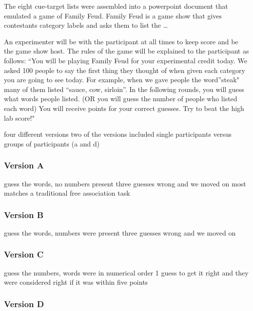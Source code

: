 \documentclass[man]{apa6}
\theoremstyle{definition}
\theoremstyle{definition}
\theoremstyle{definition}
\theoremstyle{remark}
\begin{document}
The eight cue-target lists were assembled into a powerpoint document
that emulated a game of Family Feud. Family Feud is a game show that
gives contestants category labels and asks them to list the \ldots{}

An experimenter will be with the participant at all times to keep score
and be the game show host. The rules of the game will be explained to
the participant as follows: \enquote{You will be playing Family Feud for
your experimental credit today. We asked 100 people to say the first
thing they thought of when given each category you are going to see
today. For example, when we gave people the word}steak" many of them
listed \enquote{sauce, cow, sirloin}. In the following rounds, you will
guess what words people listed. (OR you will guess the number of people
who listed each word) You will receive points for your correct guesses.
Try to beat the high lab score!"

four different versions two of the versions included single participants
versus groups of participants (a and d)

\hypertarget{version-a}{%
\subsubsection{Version A}\label{version-a}}

guess the words, no numbers present three guesses wrong and we moved on
most matches a traditional free association task

\hypertarget{version-b}{%
\subsubsection{Version B}\label{version-b}}

guess the words, numbers were present three guesses wrong and we moved
on

\hypertarget{version-c}{%
\subsubsection{Version C}\label{version-c}}

guess the numbers, words were in numerical order 1 guess to get it right
and they were considered right if it was within five points

\hypertarget{version-d}{%
\subsubsection{Version D}\label{version-d}}
\end{document}
